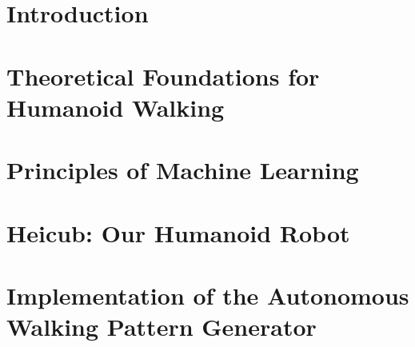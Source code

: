 \documentclass  [
paper    = a4,
BCOR     = 10mm,
twoside,
fontsize = 12pt,
toc      = bibnumbered,
toc      = listofnumbered,
numbers  = noendperiod,
headings = normal,
listof   = leveldown,
version  = 3.03
]                                       {scrreprt}
\begin{document}
	
	
	\tableofcontents
	
	\chapter{Introduction}
	
	
	\chapter{Theoretical Foundations for Humanoid Walking}
	
	\chapter{Principles of Machine Learning}

	\chapter{Heicub: Our Humanoid Robot}
	

	\chapter{Implementation of the Autonomous Walking Pattern Generator}
	
	
	
	
	
	
\end{document}
